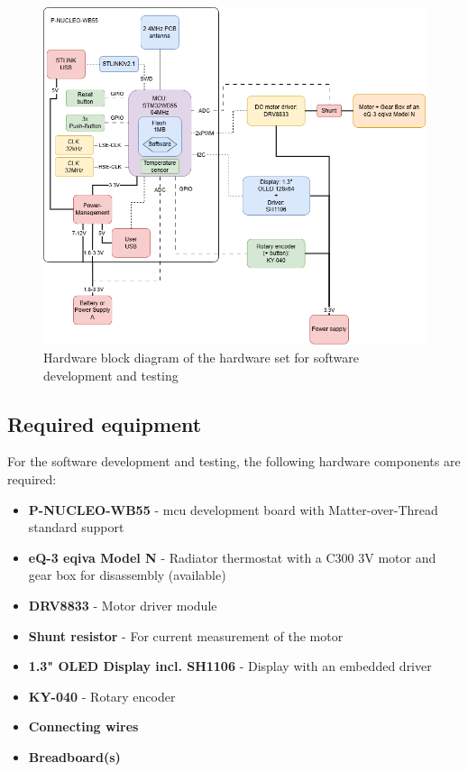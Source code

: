 \begin{figure}[htbp]
    \centering
    \includegraphics[width=1.0\textwidth]{../../electronics/mt-rt-sw-dev-hw-block-diagram.png}
    \caption{Hardware block diagram of the hardware set for software development and testing}
    \label{fig:mt-rt-sw-dev-hw-block-diagram}
\end{figure}

\subsection{Required equipment}
\label{sec:Required equipment}

For the software development and testing, the following hardware components are required:

\begin{itemize}
    \item \textbf{P-NUCLEO-WB55} - \acs{mcu} development board with Matter-over-Thread standard support
    \item \textbf{eQ-3 eqiva Model N} - Radiator thermostat with a C300 3V motor and gear box for disassembly (available)
    \item \textbf{DRV8833} - Motor driver module
    \item \textbf{Shunt resistor} - For current measurement of the motor
    \item \textbf{1.3" OLED Display incl. SH1106} - Display with an embedded driver
    \item \textbf{KY-040} - Rotary encoder
    \item \textbf{Connecting wires}
    \item \textbf{Breadboard(s)}
\end{itemize}
